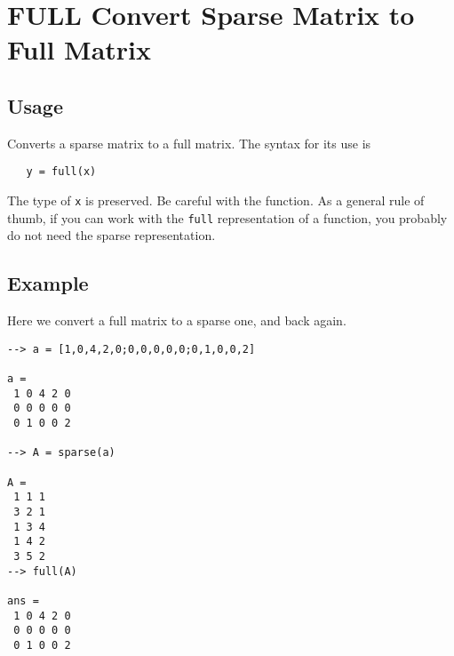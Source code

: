 \section{FULL Convert Sparse Matrix to Full Matrix}

\subsection{Usage}

Converts a sparse matrix to a full matrix.  The syntax for
its use is
\begin{verbatim}
   y = full(x)
\end{verbatim}
The type of \verb|x| is preserved.  Be careful with the function.
As a general rule of thumb, if you can work with the \verb|full|
representation of a function, you probably do not need the
sparse representation.
\subsection{Example}

Here we convert a full matrix to a sparse one, and back again.
\begin{verbatim}
--> a = [1,0,4,2,0;0,0,0,0,0;0,1,0,0,2]

a = 
 1 0 4 2 0 
 0 0 0 0 0 
 0 1 0 0 2 

--> A = sparse(a)

A = 
 1 1 1
 3 2 1
 1 3 4
 1 4 2
 3 5 2
--> full(A)

ans = 
 1 0 4 2 0 
 0 0 0 0 0 
 0 1 0 0 2 
\end{verbatim}
